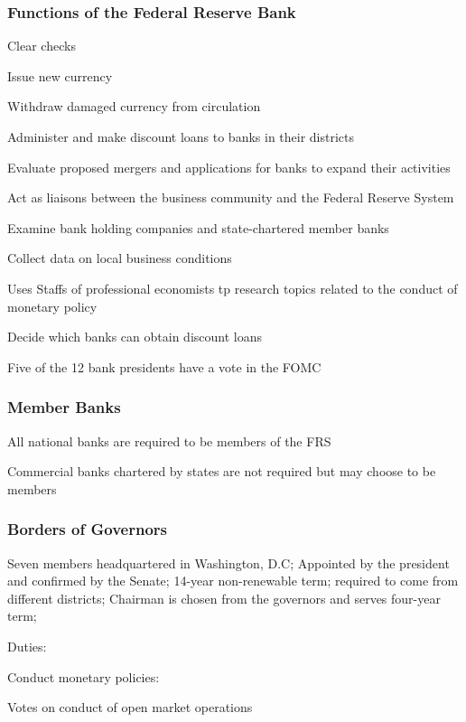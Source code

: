 \documentclass[10pt, a4paper]{article}
\begin{document}
        \subsubsection{Functions of the Federal Reserve Bank} 
        
        Clear checks 

        Issue new currency

        Withdraw damaged currency from circulation 

        Administer and make discount loans to banks in their districts

        Evaluate proposed mergers and applications for banks to expand their activities 

        Act as liaisons between the business community and the Federal Reserve System

        Examine bank holding companies and state-chartered member banks

        Collect data on local business conditions 

        Uses Staffs of professional economists tp research topics related to the conduct of monetary  policy 

        Decide which banks can obtain discount loans 

        Five of the 12 bank presidents have a vote in the FOMC
    
    \subsubsection{Member Banks}
        All national banks are required to be members of the FRS
        
        Commercial banks chartered by states are not required but may choose to be members

    \subsubsection{Borders of Governors} 
        Seven members headquartered in Washington, D.C; Appointed by the president and confirmed by the Senate; 14-year non-renewable term; required to come from different districts; Chairman is chosen from the governors and serves four-year term;

        Duties: 

            \quad Conduct monetary policies:
            
            \quad \quad  Votes on conduct of open market operations 
\end{document}
